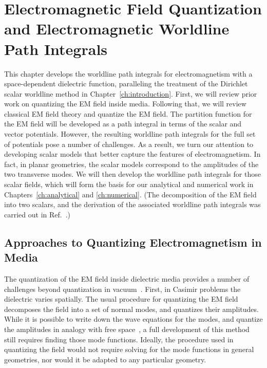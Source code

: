 \chapter{Electromagnetic Field Quantization and Electromagnetic Worldline Path Integrals}

\label{ch:EM_quantization}

This chapter develops the worldline path integrals for electromagnetism with a space-dependent
dielectric function, paralleling the treatment of the Dirichlet scalar worldline method in Chapter~\ref{ch:introduction}.  
First, we will review prior work on quantizing the EM field inside media.
Following that, we will review classical EM field theory and quantize the EM field.
The partition function for the EM field will be developed as a path integral in terms of the scalar and vector potentials.
However, the resulting worldline path integrals for the full set of potentials pose a number of challenges.
As a result, we turn our attention to developing scalar models that better capture the features
of electromagnetism.  In fact, in planar geometries, the scalar models correspond to 
the amplitudes of the two transverse modes.  
We will then develop the worldline path integrals for those scalar fields, which will form
the basis for our analytical and numerical work in Chapters~\ref{ch:analytical} and \ref{ch:numerical}.  
(The decomposition of the EM field into two scalars, and the derivation of the associated 
worldline path integrals was carried out in Ref.~\cite{Mackrory2016}.)

\section{Approaches to Quantizing Electromagnetism in Media}

The quantization of the EM field inside dielectric media provides a number of challenges 
beyond quantization in vacuum~\cite{Huttner1992,Dung1998,Bechler1999,Bordag1998,Rahi2009,Reid2013}.  
 First, in Casimir problems the dielectric varies spatially.  The usual procedure for
quantizing the EM field decomposes the field into a set of normal modes, and quantizes their amplitudes.
  While it is possible to write down the wave equations for the modes, and quantize the amplitudes
 in analogy with free space~\cite{Glauber1991}, a full development of this method still requires finding those mode functions.
 Ideally, the procedure used in quantizing the field would not require solving for the mode functions in
general geometries, nor would it be adapted to any particular geometry.   

